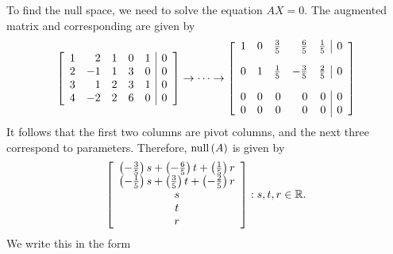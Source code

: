 \begin{solution}
To find the null space, we need to solve the equation $AX=0$. The augmented matrix and corresponding {\rref} are given by 
\begin{equation*}
\leftB 
\begin{array}{rrrrr|r}
1 & 2 & 1 & 0 & 1 & 0 \\ 
2 & -1 & 1 & 3 & 0 & 0 \\ 
3 & 1 & 2 & 3 & 1 & 0 \\ 
4 & -2 & 2 & 6 & 0 & 0
\end{array}
\rightB
\rightarrow \cdots \rightarrow
\leftB 
\begin{array}{rrrrr|r}
1 & 0 & \vspace{0.05in}\frac{3}{5} & \vspace{0.05in}\frac{6}{5} & \vspace{0.05in}\frac{1}{5} & 0 \\ 
0 & 1 & \vspace{0.05in}\frac{1}{5} & -\vspace{0.05in}\frac{3}{5} & \vspace{0.05in}\frac{2}{5} & 0 \\ 
0 & 0 & 0 & 0 & 0 & 0 \\ 
0 & 0 & 0 & 0 & 0 & 0
\end{array}
\rightB
\end{equation*}
It follows that the first two columns are pivot columns, and the next three correspond to parameters. Therefore, $\mbox{null} \left( A\right) $ is given by 
\begin{equation*}
\leftB 
\begin{array}{c}
\left( -\vspace{0.05in}\frac{3}{5}\right) s +\left( -\vspace{0.05in}\frac{6}{5}\right) t+\left( 
\vspace{0.05in}\frac{1}{5}\right) r \\ 
\left( -\vspace{0.05in}\frac{1}{5}\right) s +\left( \vspace{0.05in}\frac{3}{5}\right) t +\left( -
\vspace{0.05in}\frac{2}{5}\right) r \\ 
s \\ 
t \\ 
r
\end{array}
\rightB :s ,t ,r\in \mathbb{R}\text{.}
\end{equation*}
We write this in the form 
\begin{equation*}

\end{equation*}
\end{solution}
